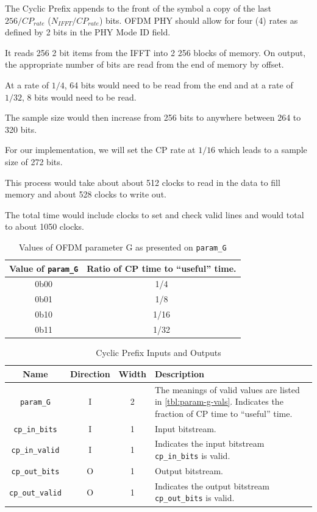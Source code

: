 \documentclass[dvips,10pt,twocolumn]{article}
\newcommand{\wire}{\texttt}
\begin{document}
	The Cyclic Prefix appends to the front of the symbol a copy of the last
 	$256/CP_{rate}$ ($N_{IFFT}/CP_{rate}$) bits. OFDM PHY should allow for four
	(4) rates as defined by 2 bits in the PHY Mode ID field. 
	
	It reads 256 2 bit items from the IFFT into 2 256 blocks of memory.
	On output, the appropriate number of bits are read from the end of 
	memory by offset.
	
	At a rate of $1/4$, 64 bits would need to be read from the end and 
	at a rate of $1/32$, 8 bits would need to be read.
	
	The sample size would then increase from 256 bits to anywhere between
	264 to 320 bits.
	
	For our implementation, we will set the CP rate at $1/16$ which leads to
	a sample size of 272 bits.
	
	This process would take about about 512 clocks to read in the data to fill
	memory and about 528 clocks to write out. 

	The total time would include clocks to set and check valid lines and would
	total to about 1050 clocks. 
	
	\begin{table}
	\begin{tabulary}{\linewidth}{C|C}
		\label{tbl:param-g-vals}
		Value of \wire{param\_G} & Ratio of CP time to
		``useful'' time. \\ \hline

		0b00 & 1/4 \\
		0b01 & 1/8 \\
		0b10 & 1/16 \\
		0b11 & 1/32 \\

	\end{tabulary}
	\caption{Values of OFDM parameter G as presented on
	\wire{param\_G}}
	\end{table}

	\begin{table}
	\begin{tabularx}{\linewidth}{c|c|c|X}
		\label{tbl:cp-io}
		Name & Direction & Width & Description \\ \hline

		\wire{param\_G} & I & 2 & The meanings of valid values
		are listed in \autoref{tbl:param-g-vals}. Indicates the
		fraction of CP time to ``useful'' time.
		\\

		\wire{cp\_in\_bits} & I & 1 & Input bitstream. \\
		
		\wire{cp\_in\_valid} & I & 1 & Indicates the input
		bitstream \wire{cp\_in\_bits} is valid. \\

		\wire{cp\_out\_bits} & O & 1 & Output bitstream. \\

		\wire{cp\_out\_valid} & O & 1 & Indicates the output
		bitstream \wire{cp\_out\_bits} is valid.
	\end{tabularx}
	\caption{Cyclic Prefix Inputs and Outputs}
	\end{table}
\end{document}
